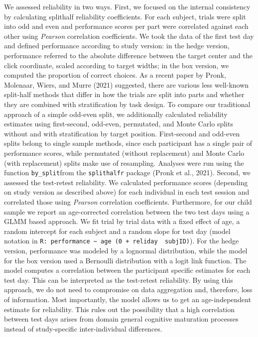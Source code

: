 \documentclass[
  man,floatsintext]{apa6}
\begin{document}
We assessed reliability in two ways.
First, we focused on the internal consistency by calculating splithalf reliability coefficients. For each subject, trials were split into odd and even and performance scores per part were correlated against each other using \emph{Pearson} correlation coefficients. We took the data of the first test day and defined performance according to study version: in the hedge version, performance referred to the absolute difference between the target center and the click coordinate, scaled according to target widths; in the box version, we computed the proportion of correct choices.
As a recent paper by Pronk, Molenaar, Wiers, and Murre (2021) suggested, there are various less well-known split-half methods that differ in how the trials are split into parts and whether they are combined with stratification by task design. To compare our traditional approach of a simple odd-even split, we additionally calculated reliability estimates using first-second, odd-even, permutated, and Monte Carlo splits without and with stratification by target position. First-second and odd-even splits belong to single sample methods, since each participant has a single pair of performance scores, while permutated (without replacement) and Monte Carlo (with replacement) splits make use of resampling. Analyses were run using the function \texttt{by\_split}from the \texttt{splithalfr} package (Pronk et al., 2021).
Second, we assessed the test-retest reliability. We calculated performance scores (depending on study version as described above) for each individual in each test session and correlated those using \emph{Pearson} correlation coefficients. Furthermore, for our child sample we report an age-corrected correlation between the two test days using a GLMM based approach. We fit trial by trial data with a fixed effect of age, a random intercept for each subject and a random slope for test day (model notation in \texttt{R:\ performance\ \textasciitilde{}\ age\ (0\ +\ reliday\ \textbar{}\ subjID)}). For the hedge version, performance was modeled by a lognormal distribution, while the model for the box version used a Bernoulli distribution with a logit link function.
The model computes a correlation between the participant specific estimates for each test day. This can be interpreted as the test-retest reliability. By using this approach, we do not need to compromise on data aggregation and, therefore, loss of information. Most importantly, the model allows us to get an age-independent estimate for reliability. This rules out the possibility that a high correlation between test days arises from domain general cognitive maturation processes instead of study-specific inter-individual differences.
\end{document}

